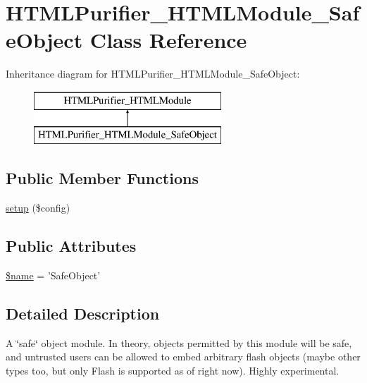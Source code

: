 \hypertarget{classHTMLPurifier__HTMLModule__SafeObject}{\section{H\+T\+M\+L\+Purifier\+\_\+\+H\+T\+M\+L\+Module\+\_\+\+Safe\+Object Class Reference}
\label{classHTMLPurifier__HTMLModule__SafeObject}
}
Inheritance diagram for H\+T\+M\+L\+Purifier\+\_\+\+H\+T\+M\+L\+Module\+\_\+\+Safe\+Object\+:\begin{figure}[H]
\begin{center}
\leavevmode
\includegraphics[height=2.000000cm]{classHTMLPurifier__HTMLModule__SafeObject}
\end{center}
\end{figure}
\subsection*{Public Member Functions}
\begin{DoxyCompactItemize}
\item 
\hyperlink{classHTMLPurifier__HTMLModule__SafeObject_a723f5454f87ff69ef4e6c9e7ad945087}{setup} (\$config)
\end{DoxyCompactItemize}
\subsection*{Public Attributes}
\begin{DoxyCompactItemize}
\item 
\hyperlink{classHTMLPurifier__HTMLModule__SafeObject_a19aa497b76849a5cfb28e085cbaec377}{\$name} = 'Safe\+Object'
\end{DoxyCompactItemize}


\subsection{Detailed Description}
A \char`\"{}safe\char`\"{} object module. In theory, objects permitted by this module will be safe, and untrusted users can be allowed to embed arbitrary flash objects (maybe other types too, but only Flash is supported as of right now). Highly experimental. 

